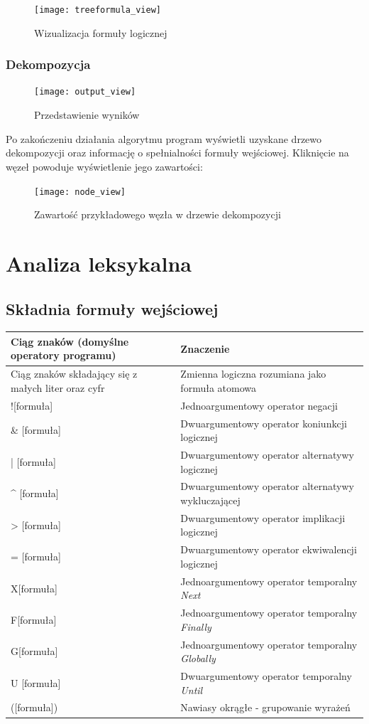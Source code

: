 \documentclass[12pt,a4paper,titlepage]{article}
\begin{document}
\begin{figure}[H]
\centering
\texttt{[image: treeformula\_view]}
\caption{Wizualizacja formuły logicznej}
\end{figure}

\subsubsection{Dekompozycja}
\begin{figure}[H]
\centering
\texttt{[image: output\_view]}
\caption{Przedstawienie wyników}
\end{figure}

Po zakończeniu działania algorytmu program wyświetli uzyskane drzewo dekompozycji oraz informację o spełnialności formuły wejściowej. Kliknięcie na węzeł powoduje wyświetlenie jego zawartości:

\begin{figure}[H]
\centering
\texttt{[image: node\_view]}
\caption{Zawartość przykładowego węzła w drzewie dekompozycji}
\end{figure}

\section{Analiza leksykalna}

\subsection{Składnia formuły wejściowej}
\label{skladnia}
\begin{tabular}{|C{5cm}|C{5cm}|}
  \hline
  \textbf{Ciąg znaków (domyślne operatory programu)} & \textbf{Znaczenie}\\ 
  \hline 
  Ciąg znaków składający się z małych liter oraz cyfr & Zmienna logiczna rozumiana jako formuła atomowa\\
  \hline
  ![formuła] & Jednoargumentowy operator negacji\\
  \hline
  [formuła] \& [formuła] & Dwuargumentowy operator koniunkcji logicznej\\
  \hline
  [formuła] | [formuła] & Dwuargumentowy operator alternatywy logicznej\\
  \hline
  [formuła] \^{} [formuła] & Dwuargumentowy operator alternatywy wykluczającej\\
  \hline
  [formuła] > [formuła] & Dwuargumentowy operator implikacji logicznej\\
  \hline
  [formuła] = [formuła] & Dwuargumentowy operator ekwiwalencji logicznej\\
  \hline
  X[formuła] & Jednoargumentowy operator temporalny \textit{Next}\\
  \hline
  F[formuła] & Jednoargumentowy operator temporalny \textit{Finally}\\
  \hline
  G[formuła] & Jednoargumentowy operator temporalny \textit{Globally}\\
  \hline
  [formuła] U [formuła] & Dwuargumentowy operator temporalny \textit{Until}\\
  \hline
  ([formuła]) & Nawiasy okrągłe - grupowanie wyrażeń\\
  \hline
\end{tabular}
\end{document}
